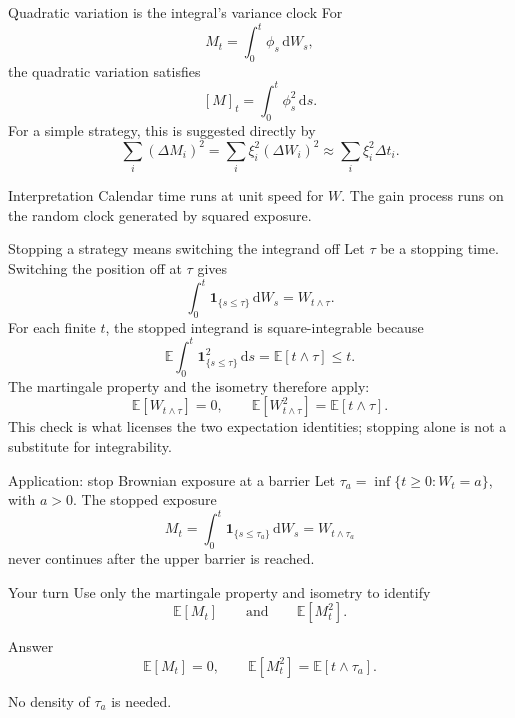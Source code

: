 \documentclass[handout,10pt,aspectratio=169]{beamer}
\newcommand{\E}{\mathbb E}
\newcommand{\dd}{\,\mathrm d}
\begin{document}
\begin{frame}{Quadratic variation is the integral's variance clock}
For
\[
M_t=\int_0^t\phi_s\dd W_s,
\]
the quadratic variation satisfies
\[
\boxed{[M]_t=\int_0^t\phi_s^2\dd s.}
\]
For a simple strategy, this is suggested directly by
\[
\sum_i(\Delta M_i)^2
=\sum_i\xi_i^2(\Delta W_i)^2
\approx\sum_i\xi_i^2\Delta t_i.
\]
\begin{block}{Interpretation}
Calendar time runs at unit speed for \(W\). The gain process runs on the random clock generated by squared exposure.
\end{block}
\end{frame}

\begin{frame}{Stopping a strategy means switching the integrand off}
\small
Let \(\tau\) be a stopping time. Switching the position off at \(\tau\) gives
\[
\boxed{
\int_0^t\mathbf 1_{\{s\le\tau\}}\dd W_s
=W_{t\wedge\tau}.}
\]
For each finite \(t\), the stopped integrand is square-integrable because
\[
\E\int_0^t\mathbf 1_{\{s\le\tau\}}^2\dd s
=\E[t\wedge\tau]\le t.
\]
The martingale property and the isometry therefore apply:
\[
\boxed{
\E[W_{t\wedge\tau}]=0,
\qquad
\E[W_{t\wedge\tau}^2]=\E[t\wedge\tau].}
\]
This check is what licenses the two expectation identities; stopping alone is not a substitute for integrability.
\end{frame}

\begin{frame}{Application: stop Brownian exposure at a barrier}
Let \(\tau_a=\inf\{t\ge0:W_t=a\}\), with \(a>0\). The stopped exposure
\[
M_t=\int_0^t\mathbf 1_{\{s\le\tau_a\}}\dd W_s
=W_{t\wedge\tau_a}
\]
never continues after the upper barrier is reached.
\begin{block}{Your turn}
Use only the martingale property and isometry to identify
\[
\E[M_t]
\qquad\text{and}\qquad
\E[M_t^2].
\]
\end{block}

\begin{block}{Answer}
\[
\E[M_t]=0,
\qquad
\E[M_t^2]=\E[t\wedge\tau_a].
\]
\end{block}
No density of \(\tau_a\) is needed.
\end{frame}
\end{document}
